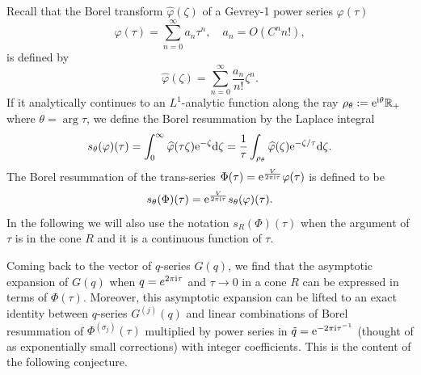 \documentclass[12pt,reqno]{amsart}
\theoremstyle{definition}
\def\s{\sigma}
\def\tq{\tilde{q}}
\def\ri{\mathrm{i}}
\def\rd{\mathrm{d}}
\def\re{{\rm e}}
\def\ri{{\rm i}}
\def\rd{{\rm d}}
\def\IR{\mathbb{R}}
\begin{document}
Recall that the Borel transform $\widehat{\varphi}(\zeta)$ of a 
Gevrey-1 power series $\varphi(\tau)$ 
\begin{equation}
  \varphi(\tau) = \sum_{n=0}^\infty a_n\tau^n,\quad a_n = O(C^n n!),
\end{equation}
is defined by
\begin{equation}
  \widehat{\varphi}(\zeta) =\sum_{n=0}^\infty \frac{a_n}{n!}\zeta^n.
\end{equation}
If it analytically continues to an $L^1$-analytic function along the
ray $\rho_\theta:=\re^{\ri\theta}\IR_+$ where $\theta = \arg\tau$, we
define the Borel resummation by the Laplace integral
\begin{equation}
  s_\theta(\varphi)(\tau) =
  \int_0^\infty \widehat{\varphi}(\tau\zeta)
  \re^{-\zeta}\rd \zeta =
  \frac{1}{\tau}\int_{\rho_\theta}
  \widehat{\varphi}(\zeta)\re^{-\zeta/\tau}\rd
  \zeta.
  \label{eq:svarphi}
\end{equation}
The Borel resummation of the trans-series $\Phi(\tau) =
\re^{\frac{V}{2\pi\ri\tau}}\varphi(\tau)$ is defined to be
\begin{equation}
  s_\theta(\Phi)(\tau) =
  \re^{\frac{V}{2\pi\ri\tau}}s_\theta(\varphi)(\tau).
  \label{eq:sPhi}
\end{equation}
In the following we will also use the notation $s_R(\Phi)(\tau)$ when
the argument of $\tau$ is in the cone $R$ and it is a continuous
function of $\tau$.



Coming back to the vector of $q$-series $G(q)$, we find that the
asymptotic expansion of $G(q)$ when $q=e^{2\pi\ri\tau}$ and
$\tau \to 0$ in a cone $R$ can be expressed in terms of
$\Phi(\tau)$. Moreover, this asymptotic expansion can be lifted to an
exact identity between $q$-series $G^{(j)}(q)$ and linear combinations
of Borel resummation of $\Phi^{(\s_j)}(\tau)$ multiplied by power
series in $\tq = \re^{-2\pi\ri\tau^{-1}}$ (thought of as exponentially
small corrections) with integer coefficients. This is the content of
the following conjecture.
\end{document}
